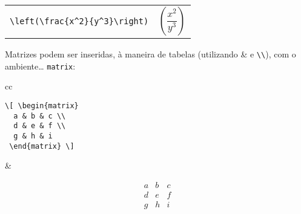 \documentclass{scrartcl}
\begin{document}
\begin{center}
\begin{tabular}{cc}
\begin{minipage}{0.3\textwidth}
\begin{verbatim}
\left(\frac{x^2}{y^3}\right)
\end{verbatim}
\end{minipage}
&
\begin{minipage}{0.3\textwidth}
\begin{displaymath}
\left(\frac{x^2}{y^3}\right)
\end{displaymath}
\end{minipage}
\end{tabular}
\end{center}

\medskip

Matrizes  podem ser inseridas, à maneira de tabelas (utilizando \& e \verb+\\+), com o ambiente\ldots{} \texttt{matrix}:

\medskip

\begin{center}
\begin{tabular}{cc}
\begin{minipage}{0.2\textwidth}
\begin{verbatim}
\[ \begin{matrix}
  a & b & c \\
  d & e & f \\
  g & h & i
 \end{matrix} \]
\end{verbatim}
\end{minipage} &%
 \begin{minipage}{0.2\textwidth}
\[  \begin{matrix}
   a & b & c \\
   d & e & f \\
   g & h & i
  \end{matrix} \]
  \end{minipage}
\end{tabular}
\end{center}

\medskip


\begin{center}
\end{center}

\bigskip
\end{document}
